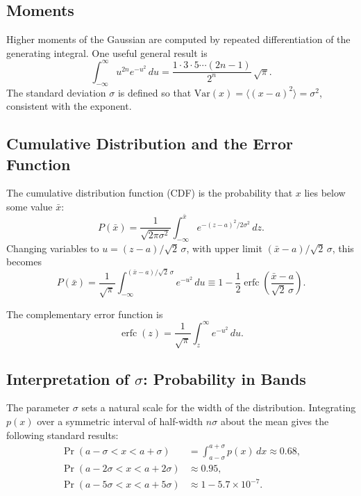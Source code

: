 \subsection{Moments}

Higher moments of the Gaussian are computed by repeated differentiation of the generating integral. One useful general result is
\begin{equation}
    \int_{-\infty}^{\infty} u^{2n} e^{-u^2}\,du = \frac{1 \cdot 3 \cdot 5 \cdots (2n-1)}{2^n}\,\sqrt{\pi}.
\end{equation}
The standard deviation $\sigma$ is defined so that $\mathrm{Var}(x) = \langle(x-a)^2\rangle = \sigma^2$, consistent with the exponent.

\subsection{Cumulative Distribution and the Error Function}

The cumulative distribution function (CDF) is the probability that $x$ lies below some value $\bar{x}$:
\begin{equation}
    P(\bar{x}) = \frac{1}{\sqrt{2\pi\sigma^2}} \int_{-\infty}^{\bar{x}} e^{-(z-a)^2/2\sigma^2}\,dz.
\end{equation}
Changing variables to $u = (z-a)/\sqrt{2}\,\sigma$, with upper limit $(\bar{x}-a)/\sqrt{2}\,\sigma$, this becomes
\begin{equation}
    P(\bar{x}) = \frac{1}{\sqrt{\pi}} \int_{-\infty}^{(\bar{x}-a)/\sqrt{2}\,\sigma} e^{-u^2}\,du
    \equiv 1 - \frac{1}{2}\operatorname{erfc}\!\left(\frac{\bar{x}-a}{\sqrt{2}\,\sigma}\right).
\end{equation}

\begin{definition}
The complementary error function is
\begin{equation}
    \operatorname{erfc}(z) = \frac{1}{\sqrt{\pi}}\int_{z}^{\infty} e^{-u^2}\,du.
\end{equation}
\end{definition}

\subsection{Interpretation of $\sigma$: Probability in Bands}

The parameter $\sigma$ sets a natural scale for the width of the distribution. Integrating $p(x)$ over a symmetric interval of half-width $n\sigma$ about the mean gives the following standard results:
\begin{align}
    \Pr(a - \sigma < x < a + \sigma) &= \int_{a-\sigma}^{a+\sigma} p(x)\,dx \approx 0.68, \\
    \Pr(a - 2\sigma < x < a + 2\sigma) &\approx 0.95, \\
    \Pr(a - 5\sigma < x < a + 5\sigma) &\approx 1 - 5.7\times 10^{-7}.
\end{align}

